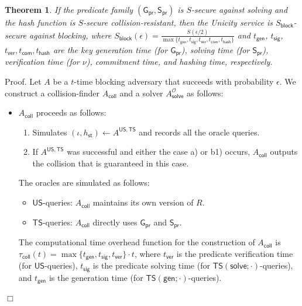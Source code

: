 \documentclass{article}
\newtheorem{theorem}{Theorem}[section]
\newenvironment{proof}{\textsf{Proof}.}{\hfill$\Box$}
\newcommand{\unisrv}[0]{\mathsf{US}}
\newcommand{\sthash}[0]{h_\mathsf{st}}
\newcommand{\predi}[0]{\nu}
\newcommand{\prgen}[0]{\mathsf{G}_\mathsf{pr}}
\newcommand{\prsig}[0]{\mathsf{S}_\mathsf{pr}}
\begin{document}
\begin{theorem}
If the predicate family $(\prgen,\prsig)$ is $S$-secure against solving and the hash function is $S$-secure collision-resistant, then the Unicity service is
$S_\mathsf{block}$-secure against blocking, where $S_\mathsf{block}(\epsilon) =
\frac{S(\epsilon/2)}{\max\{t_\mathsf{gen}, t_\mathsf{sig}, t_\mathsf{ver},t_\mathsf{com},t_\mathsf{hash}\}}$
and
$t_\mathsf{gen}$, $t_\mathsf{sig}$, $t_\mathsf{ver},t_\mathsf{com},t_\mathsf{hash}$ are the
key generation time (for $\prgen$), solving time (for $\prsig$), verification time (for $\predi$), commitment time, and hashing time, respectively.
\end{theorem}
\begin{proof}
Let $A$ be a $t$-time blocking adversary that succeeds with probability $\epsilon$. We construct a collision-finder $A_\mathsf{coll}$ and a
solver $A^\mathcal{O}_\mathsf{solve}$ as follows:
\begin{itemize}
\item $A_\mathsf{coll}$ proceeds as follows:
 \begin{enumerate}
   \item Simulates $(\iota,\sthash)\gets A^{\mathsf{US},\mathsf{TS}}$ and records all the oracle queries.
   \item If $A^{\mathsf{US},\mathsf{TS}}$ was successful and either the case a) or b1) occurs, $A_\mathsf{coll}$ outputs the collision that is guaranteed in this case.
 \end{enumerate}
The oracles are simulated as follows:
 \begin{itemize}
   \item $\mathsf{US}$-queries: $A_\mathsf{coll}$ maintains its own version of $R$.
   \item $\mathsf{TS}$-queries: $A_\mathsf{coll}$ directly uses $\prgen$ and $\prsig$.
\end{itemize}
The computational time overhead function for the construction of $A_\mathsf{coll}$ is $\tau_\mathsf{coll}(t) = \max\{t_\mathsf{gen}, t_\mathsf{sig}, t_\mathsf{ver}\}\cdot t$, where
$t_\mathsf{ver}$ is the predicate verification time (for $\unisrv$-queries),
$t_\mathsf{sig}$ is the predicate solving time (for $\mathsf{TS}(\mathsf{solve};\cdot)$-queries), and $t_\mathsf{gen}$ is the generation time (for $\mathsf{TS}(\mathsf{gen};\cdot)$-queries).


\end{itemize}
\end{proof}
\end{document}
